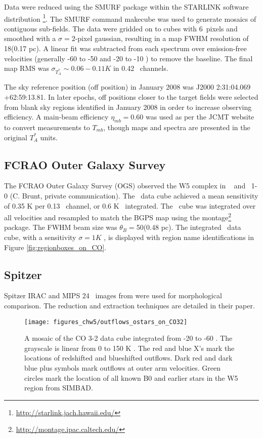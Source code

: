 Data were reduced using the SMURF package within the STARLINK software distribution
\footnote{\url{http://starlink.jach.hawaii.edu/}}.  The SMURF command {\sc makecube} was used to
generate mosaics of contiguous sub-fields.  The data were gridded on to cubes
with 6\arcsec\ pixels and smoothed with a $\sigma=2$-pixel gaussian, resulting
in a map FWHM resolution of 18\arcsec (0.17 pc).  A linear fit was subtracted from each
spectrum over emission-free velocities (generally -60 to -50 and -20 to -10
\kms) to remove the baseline.  The final map RMS was $\sigma_{T_A^*}\sim
0.06-0.11 K$ in 0.42 \kms\ channels.

The sky reference position (off position) in January 2008 was J2000 2:31:04.069 +62:59:13.81.
In later epochs, off positions closer to the target fields were selected from blank sky regions
identified in January 2008 in order to increase observing efficiency.  A
main-beam efficiency $\eta_{mb}=0.60$ was used as per the JCMT website to
convert measurements to $T_{mb}$, though maps and spectra are presented in the
original $T_A^*$ units.

\subsection{FCRAO Outer Galaxy Survey}
The FCRAO Outer Galaxy Survey (OGS)
observed the W5 complex in \twelveco\  \citep{heyer:ogs:1998} and \thirteenco\
1-0 (C. Brunt, private communication).  The \thirteenco\ data cube achieved a
mean sensitivity of 0.35 K per 0.13 \kms\ channel, or 0.6 K \kms\ integrated.
The \thirteenco\ cube was integrated over all velocities and resampled to match
the BGPS map using the {\sc montage}\footnote{\url{http://montage.ipac.caltech.edu/}}
package.  The FWHM beam size was  $\theta_{B}=$50\farcs (0.48 pc).  The integrated
\twelveco\ data cube, with a sensitivity $\sigma= 1 K$ \kms, is displayed with 
region name identifications in Figure \ref{fig:regionboxes_on_CO}.

\subsection{Spitzer}
Spitzer IRAC and MIPS 24 \um\ images from \citet{koenig:clustered:2008} were
used for morphological comparison.  The reduction and extraction techniques are
detailed in their paper.

\begin{figure*}
  \texttt{[image: figures\_chw5/outflows\_ostars\_on\_CO32]}
  \caption{A mosaic of the CO 3-2 data cube integrated from -20 to -60 \kms.
  The grayscale is linear from 0 to 150 K \kms.  The red and blue X's mark the
  locations of redshifted and blueshifted outflows.  Dark red and dark blue
  plus symbols mark outflows at outer arm velocities.  Green circles mark the
  location of all known B0 and earlier stars in the W5 region from SIMBAD.}
  \label{fig:outflows_on_co32}
\end{figure*}

